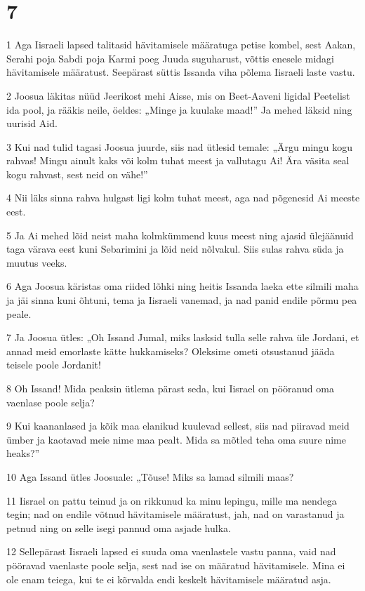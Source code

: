 \chapter{7}

\par 1 Aga Iisraeli lapsed talitasid hävitamisele määratuga petise kombel, sest Aakan, Serahi poja Sabdi poja Karmi poeg Juuda suguharust, võttis enesele midagi hävitamisele määratust. Seepärast süttis Issanda viha põlema Iisraeli laste vastu.
\par 2 Joosua läkitas nüüd Jeerikost mehi Aisse, mis on Beet-Aaveni ligidal Peetelist ida pool, ja rääkis neile, öeldes: „Minge ja kuulake maad!” Ja mehed läksid ning uurisid Aid.
\par 3 Kui nad tulid tagasi Joosua juurde, siis nad ütlesid temale: „Ärgu mingu kogu rahvas! Mingu ainult kaks või kolm tuhat meest ja vallutagu Ai! Ära väsita seal kogu rahvast, sest neid on vähe!”
\par 4 Nii läks sinna rahva hulgast ligi kolm tuhat meest, aga nad põgenesid Ai meeste eest.
\par 5 Ja Ai mehed lõid neist maha kolmkümmend kuus meest ning ajasid ülejäänuid taga värava eest kuni Sebarimini ja lõid neid nõlvakul. Siis sulas rahva süda ja muutus veeks.
\par 6 Aga Joosua käristas oma riided lõhki ning heitis Issanda laeka ette silmili maha ja jäi sinna kuni õhtuni, tema ja Iisraeli vanemad, ja nad panid endile põrmu pea peale.
\par 7 Ja Joosua ütles: „Oh Issand Jumal, miks lasksid tulla selle rahva üle Jordani, et annad meid emorlaste kätte hukkamiseks? Oleksime ometi otsustanud jääda teisele poole Jordanit!
\par 8 Oh Issand! Mida peaksin ütlema pärast seda, kui Iisrael on pööranud oma vaenlase poole selja?
\par 9 Kui kaananlased ja kõik maa elanikud kuulevad sellest, siis nad piiravad meid ümber ja kaotavad meie nime maa pealt. Mida sa mõtled teha oma suure nime heaks?”
\par 10 Aga Issand ütles Joosuale: „Tõuse! Miks sa lamad silmili maas?
\par 11 Iisrael on pattu teinud ja on rikkunud ka minu lepingu, mille ma nendega tegin; nad on endile võtnud hävitamisele määratust, jah, nad on varastanud ja petnud ning on selle isegi pannud oma asjade hulka.
\par 12 Sellepärast Iisraeli lapsed ei suuda oma vaenlastele vastu panna, vaid nad pööravad vaenlaste poole selja, sest nad ise on määratud hävitamisele. Mina ei ole enam teiega, kui te ei kõrvalda endi keskelt hävitamisele määratud asja.
